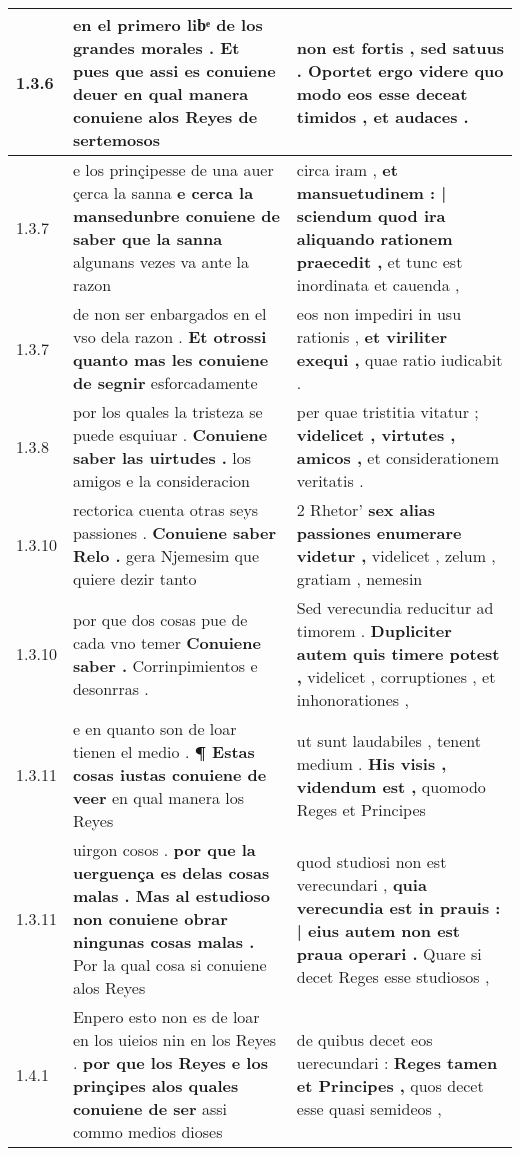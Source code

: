 \begin{tabular}{|p{1cm}|p{6.5cm}|p{6.5cm}|}
1.3.6 & en el primero libͤ de los grandes morales . \textbf{ Et pues que assi es conuiene deuer } en qual manera conuiene alos Reyes de sertemosos & non est fortis , sed satuus . \textbf{ Oportet ergo videre } quo modo eos esse deceat timidos , et audaces . \\\hline
1.3.7 & e los prinçipesse de una auer çerca la sanna \textbf{ e cerca la mansedunbre conuiene de saber que la sanna } algunans vezes va ante la razon & circa iram , \textbf{ et mansuetudinem : | sciendum quod ira aliquando rationem praecedit , } et tunc est inordinata et cauenda , \\\hline
1.3.7 & de non ser enbargados en el vso dela razon . \textbf{ Et otrossi quanto mas les conuiene de segnir } esforcadamente & eos non impediri in usu rationis , \textbf{ et viriliter exequi , } quae ratio iudicabit . \\\hline
1.3.8 & por los quales la tristeza se puede esquiuar . \textbf{ Conuiene saber las uirtudes . } los amigos e la consideracion & per quae tristitia vitatur ; \textbf{ videlicet , virtutes , amicos , } et considerationem veritatis . \\\hline
1.3.10 & rectorica cuenta otras seys passiones . \textbf{ Conuiene saber Relo . } gera Njemesim que quiere dezir tanto & 2 Rhetor’ \textbf{ sex alias passiones enumerare videtur , } videlicet , zelum , gratiam , nemesin \\\hline
1.3.10 & por que dos cosas pue de cada vno temer \textbf{ Conuiene saber . } Corrinpimientos e desonrras . & Sed verecundia reducitur ad timorem . \textbf{ Dupliciter autem quis timere potest , } videlicet , corruptiones , et inhonorationes , \\\hline
1.3.11 & e en quanto son de loar tienen el medio . \textbf{ ¶ Estas cosas iustas conuiene de veer } en qual manera los Reyes & ut sunt laudabiles , tenent medium . \textbf{ His visis , videndum est , } quomodo Reges et Principes \\\hline
1.3.11 & uirgon cosos . \textbf{ por que la uerguença es delas cosas malas . Mas al estudioso non conuiene obrar ningunas cosas malas . } Por la qual cosa si conuiene alos Reyes & quod studiosi non est verecundari , \textbf{ quia verecundia est in prauis : | eius autem non est praua operari . } Quare si decet Reges esse studiosos , \\\hline
1.4.1 & Enpero esto non es de loar en los uieios nin en los Reyes . \textbf{ por que los Reyes e los prinçipes alos quales conuiene de ser } assi commo medios dioses & de quibus decet eos uerecundari : \textbf{ Reges tamen et Principes , } quos decet esse quasi semideos , \\\hline

\end{tabular}
